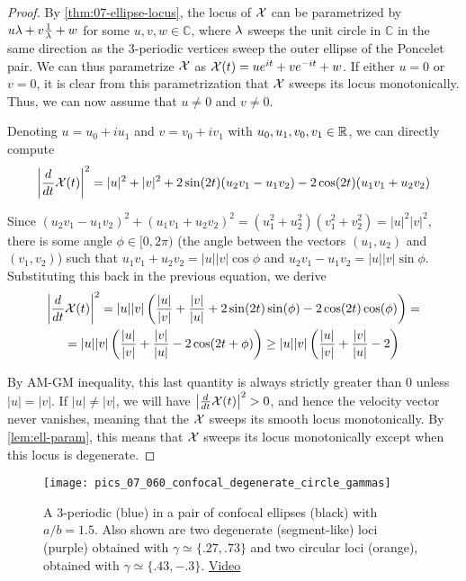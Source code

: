 \begin{proof}
By \cref{thm:07-ellipse-locus}, the locus of $\mathcal{X}$ can be parametrized by $u \lambda+v\frac{1}{\lambda}+w$ for some $u,v,w\in\mathbb{C}$, where $\lambda$ sweeps the unit circle in $\mathbb{C}$ in the same direction as the 3-periodic vertices sweep the outer ellipse of the Poncelet pair. We can thus parametrize $\mathcal{X}$ as $\mathcal{X}(t)=u e^{i t}+v e^{-i t}+w$. If either $u=0$ or $v=0$, it is clear from this parametrization that $\mathcal{X}$ sweeps its locus monotonically. Thus, we can now assume that $u\neq0$ and $v\neq0$.

Denoting $u=u_0+i u_1$ and $v=v_0+i v_1$ with $u_0,u_1,v_0,v_1\in\mathbb{R}$, we can directly compute
\[
    \left|\frac{d}{d t}\mathcal{X}(t)\right|^2= |u|^2+|v|^2 + 2 \sin (2 t) (u_2 v_1-u_1 v_2)-2 \cos (2 t) (u_1 v_1+u_2 v_2)
\]

Since $(u_2 v_1-u_1 v_2)^2+(u_1 v_1+u_2 v_2)^2=(u_1^2+u_2^2)(v_1^2+v_2^2)=|u|^2|v|^2$, there is some angle $\phi\in[0,2\pi)$ (the angle between the vectors $(u_1,u_2)$ and $(v_1,v_2)$) such that $u_1 v_1+u_2 v_2=|u| |v|\cos\phi$ and $u_2 v_1-u_1 v_2=|u| |v|\sin\phi$. Substituting this back in the previous equation, we derive
\begin{gather*}
     \left|\frac{d}{d t}\mathcal{X}(t)\right|^2=|u| |v|\left(\frac{|u|}{|v|}+\frac{|v|}{|u|}+2\sin(2t)\sin(\phi)-2\cos(2t)\cos(\phi)\right)=\\
     =|u| |v|\left(\frac{|u|}{|v|}+\frac{|v|}{|u|}-2\cos(2t+\phi)\right)\geq |u| |v|\left(\frac{|u|}{|v|}+\frac{|v|}{|u|}-2\right)
\end{gather*}

By AM-GM inequality, this last quantity is always strictly greater than 0 unless $|u|=|v|$. If $|u|\neq|v|$, we will have $\left|\frac{d}{d t}\mathcal{X}(t)\right|^2>0$, and hence the velocity vector never vanishes, meaning that the $\mathcal{X}$ sweeps its smooth locus monotonically. By \cref{lem:ell-param}, this means that $\mathcal{X}$ sweeps its locus monotonically except when this locus is degenerate.

\end{proof}

\begin{figure}
    \centering
    \texttt{[image: pics\_07\_060\_confocal\_degenerate\_circle\_gammas]}
    \caption{A 3-periodic (blue) in a pair of confocal ellipses (black) with $a/b=1.5$. Also shown are two degenerate (segment-like) loci (purple) obtained with $\gamma{\simeq}\{.27,.73\}$ and two circular loci (orange), obtained with $\gamma{\simeq}\{.43,-.3\}$. \href{https://youtu.be/haFTsq5UyK4}{Video}}
    \label{fig:07-confocal-degenerate}
\end{figure}

